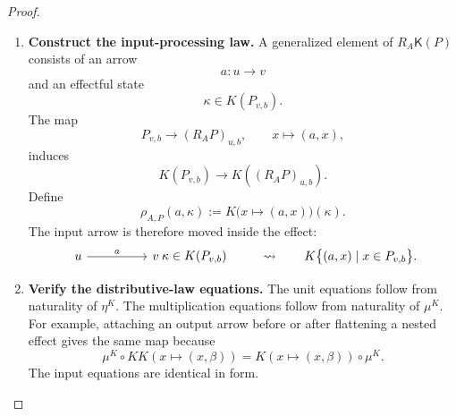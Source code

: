 \begin{proof}
\begin{enumerate}
        \item \textbf{Construct the input-processing law.}
        A generalized element of \(R_A\mathsf K(P)\) consists of an arrow
        \[
            a:u\to v
        \]
        and an effectful state
        \[
            \kappa\in K(P_{v,b}).
        \]
        The map
        \[
            P_{v,b}
            \longrightarrow
            (R_AP)_{u,b},
            \qquad
            x\longmapsto(a,x),
        \]
        induces
        \[
            K(P_{v,b})
            \longrightarrow
            K((R_AP)_{u,b}).
        \]
        Define
        \[
            \rho_{A,P}(a,\kappa)
            :=
            K\bigl(x\mapsto(a,x)\bigr)(\kappa).
        \]
        The input arrow is therefore moved inside the effect:
        \[
            \begin{tikzcd}[column sep=huge]
                    u
                        \arrow[r, "a"]
                &
                    v
                        \arrow[r, phantom, "\kappa\in K(P_{v,b})"]
                &
                    {}
            \end{tikzcd}
            \qquad\leadsto\qquad
            K\bigl\{(a,x)\mid x\in P_{v,b}\bigr\}.
        \]

        \item \textbf{Verify the distributive-law equations.}
        The unit equations follow from naturality of \(\eta^K\). The
        multiplication equations follow from naturality of \(\mu^K\).
        For example, attaching an output arrow before or after flattening a
        nested effect gives the same map because
        \[
            \mu^K
            \circ
            KK(x\mapsto(x,\beta))
            =
            K(x\mapsto(x,\beta))
            \circ
            \mu^K.
        \]
        The input equations are identical in form.


\end{enumerate}
\end{proof}
